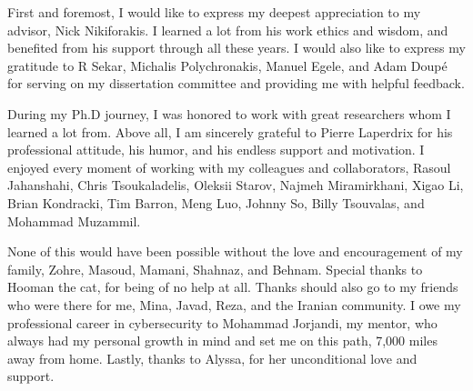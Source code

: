 First and foremost, I would like to express my deepest appreciation to my advisor, Nick Nikiforakis. 
I learned a lot from his work ethics and wisdom, and benefited from his support through all these years. 
I would also like to express my gratitude to R Sekar, Michalis Polychronakis, Manuel Egele, and Adam Doupé for serving on my dissertation committee and providing me with helpful feedback. 
 
During my Ph.D journey, I was honored to work with great researchers whom I learned a lot from. Above all, I am sincerely grateful to Pierre Laperdrix for his professional attitude, his humor, and his endless support and motivation. 
I enjoyed every moment of working with my colleagues and collaborators, Rasoul Jahanshahi, Chris Tsoukaladelis, Oleksii Starov, Najmeh Miramirkhani, Xigao Li, Brian Kondracki, Tim Barron, Meng Luo, Johnny So, Billy Tsouvalas, and Mohammad Muzammil. 

None of this would have been possible without the love and encouragement of my family, Zohre, Masoud, Mamani, Shahnaz, and Behnam. 
Special thanks to Hooman the cat, for being of no help at all. 
Thanks should also go to my friends who were there for me, Mina, Javad, Reza, and the Iranian community. 
I owe my professional career in cybersecurity to Mohammad Jorjandi, my mentor, who always had my personal growth in mind and set me on this path, 7,000 miles away from home. 
Lastly, thanks to Alyssa, for her unconditional love and support. 